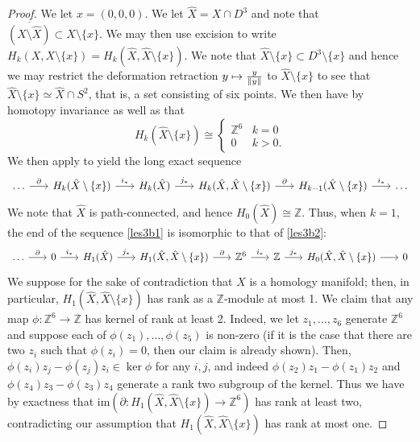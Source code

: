 \documentclass[english]{article}
\DeclarePairedDelimiter\norm{\lVert}{\rVert}%
\newcommand{\ZZ}{\mathbb{Z}}
\newcommand{\prt}[1]{\setcounter{subsection}{#1-1}\subsection{}}
\theoremstyle{remark}
\theoremstyle{definition}
\newcommand{\im}{\mathrm{im}}
\newcommand{\hX}{\hat{X}}
\newcommand{\del}{\partial}
\begin{document}
\begin{proof}
We let $x=(0,0,0)$.	We let $\hX=X\cap D^3$ and note that $\overline{(X\setminus \hX)}\subset X\setminus \{x\}$. We may then use excision to write $H_k(X,X\setminus \{x\})=H_k(\hX,\hX\setminus \{x\})$. We note that $\hX\setminus \{x\}\subset D^3\setminus \{x\}$ and hence we may restrict the deformation retraction $y\mapsto \frac{y}{\norm{y}}$ to $\hX\setminus \{x\}$ to see that $\hX\setminus \{x\}\simeq \hX\cap S^2$, that is, a set consisting of six points. We then have by homotopy invariance as well as \cite[Proposition 2.6]{at} that \begin{equation*}
	H_k(\hX\setminus \{x\})\cong\begin{cases}
\ZZ^6&k=0\\
0&k>0.
	\end{cases}
\end{equation*}
We then apply \cite[Theorem 2.16 and material following]{at} to yield the long exact sequence
\begin{equation}\begin{tikzcd}[column sep=scriptsize]
\dots \arrow[r,"\del"]&H_k(\hX\setminus \{x\})\arrow[r,"i_*"]&H_k(\hX)\arrow[r,"j_*"]&H_k(\hX,\hX\setminus \{x\})\arrow[r,"\del"]&H_{k-1}(\hX\setminus \{x\})\arrow[r,"i_*"]&\dots\label{les3b1}
\end{tikzcd}
\end{equation}
We note that $\hX$ is path-connected, and hence $H_0(\hX)\cong\ZZ$.
Thus, when $k=1$, the end of the sequence \eqref{les3b1} is isomorphic to that of \eqref{les3b2}:
\begin{equation}\begin{tikzcd}[column sep=scriptsize]
\dots \arrow[r,"\del"]&0 \arrow[r,"i_*"]&H_1(\hX)\arrow[r,"j_*"]&H_1(\hX,\hX\setminus \{x\})\arrow[r,"\del"]&\ZZ^6\arrow[r,"i_*"]&\ZZ\arrow[r,"j_*"]&H_0(\hX,\hX\setminus \{x\})\arrow[r]&0\label{les3b2}
\end{tikzcd}
\end{equation}
We suppose for the sake of contradiction that $X$ is a homology manifold; then, in particular, $H_1(\hX,\hX\setminus \{x\})$ has rank as a $\ZZ$-module at most 1. We claim that any map $\phi:\ZZ^6\to \ZZ$ has kernel of rank at least 2. Indeed, we let $z_1,\hdots,z_6$ generate $\ZZ^6$ and suppose each of $\phi(z_1),\dots,\phi(z_5)$ is non-zero (if it is the case that there are two $z_i$ such that $\phi(z_i)=0$, then our claim is already shown). Then, $\phi(z_i)z_j-\phi(z_j)z_i\in \ker \phi$ for any $i,j$, and indeed $\phi(z_2)z_1-\phi(z_1)z_2$ and $\phi(z_4)z_3-\phi(z_3)z_4$ generate a rank two subgroup of the kernel. Thus we have by exactness that $\im (\del:H_1(\hX,\hX\setminus \{x\})\to \ZZ^6)$ has rank at least two, contradicting our assumption that $H_1(\hX,\hX\setminus \{x\})$ has rank at most one.
\end{proof}\prt{3}
\end{document}
